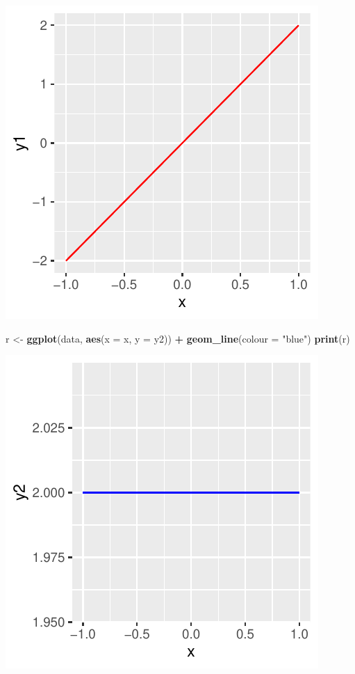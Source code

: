 \documentclass[]{book}
\newenvironment{Shaded}{\begin{snugshade}}{\end{snugshade}}
\newcommand{\DataTypeTok}[1]{\textcolor[rgb]{0.13,0.29,0.53}{#1}}
\newcommand{\KeywordTok}[1]{\textcolor[rgb]{0.13,0.29,0.53}{\textbf{#1}}}
\newcommand{\NormalTok}[1]{#1}
\newcommand{\OperatorTok}[1]{\textcolor[rgb]{0.81,0.36,0.00}{\textbf{#1}}}
\newcommand{\StringTok}[1]{\textcolor[rgb]{0.31,0.60,0.02}{#1}}
\begin{document}
\includegraphics{bookdown-demo_files/figure-latex/unnamed-chunk-10-2.pdf}

\begin{Shaded}
\begin{Highlighting}[]
\NormalTok{r <-}\StringTok{ }\KeywordTok{ggplot}\NormalTok{(data, }\KeywordTok{aes}\NormalTok{(}\DataTypeTok{x =}\NormalTok{ x, }\DataTypeTok{y =}\NormalTok{ y2)) }\OperatorTok{+}
\StringTok{  }\KeywordTok{geom_line}\NormalTok{(}\DataTypeTok{colour =} \StringTok{"blue"}\NormalTok{)}
\KeywordTok{print}\NormalTok{(r)}
\end{Highlighting}
\end{Shaded}

\includegraphics{bookdown-demo_files/figure-latex/unnamed-chunk-10-3.pdf}
\end{document}
